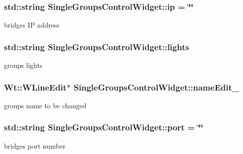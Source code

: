 \subsubsection[{\texorpdfstring{ip}{ip}}]{\setlength{\rightskip}{0pt plus 5cm}std\+::string Single\+Groups\+Control\+Widget\+::ip = \char`\"{}\char`\"{}\hspace{0.3cm}{\ttfamily [private]}}\hypertarget{classSingleGroupsControlWidget_a541ddd57077700f7a99ffca17636a771}{}\label{classSingleGroupsControlWidget_a541ddd57077700f7a99ffca17636a771}
bridge\textquotesingle{}s IP address 
\subsubsection[{\texorpdfstring{lights}{lights}}]{\setlength{\rightskip}{0pt plus 5cm}std\+::string Single\+Groups\+Control\+Widget\+::lights\hspace{0.3cm}{\ttfamily [private]}}\hypertarget{classSingleGroupsControlWidget_a0d6cf0bbd169e65cd4de29aea4a2e1b9}{}\label{classSingleGroupsControlWidget_a0d6cf0bbd169e65cd4de29aea4a2e1b9}
group\textquotesingle{}s lights 
\subsubsection[{\texorpdfstring{name\+Edit\+\_\+}{nameEdit_}}]{\setlength{\rightskip}{0pt plus 5cm}Wt\+::\+W\+Line\+Edit$\ast$ Single\+Groups\+Control\+Widget\+::name\+Edit\+\_\+\hspace{0.3cm}{\ttfamily [private]}}\hypertarget{classSingleGroupsControlWidget_ab0dfc6fa2c8b3d5d2feb1858a1c3a2ef}{}\label{classSingleGroupsControlWidget_ab0dfc6fa2c8b3d5d2feb1858a1c3a2ef}
groups\textquotesingle{} name to be changed 
\subsubsection[{\texorpdfstring{port}{port}}]{\setlength{\rightskip}{0pt plus 5cm}std\+::string Single\+Groups\+Control\+Widget\+::port = \char`\"{}\char`\"{}\hspace{0.3cm}{\ttfamily [private]}}\hypertarget{classSingleGroupsControlWidget_a6ce38d1d258028fcbefa83436ef49b5f}{}\label{classSingleGroupsControlWidget_a6ce38d1d258028fcbefa83436ef49b5f}
bridge\textquotesingle{}s port number 
